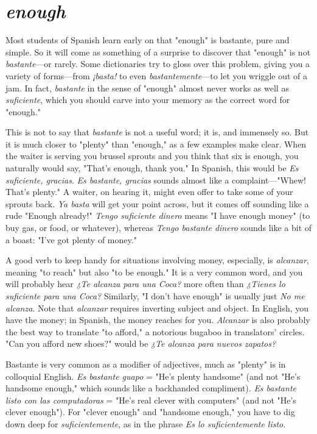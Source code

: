 \section{\emph{enough}}

Most students of Spanish learn early on that "enough" is bastante, pure and simple. So it will come as something of a surprise to
discover that "enough" is not \emph{bastante}---or rarely. Some dictionaries
try to gloss over this problem, giving you a variety of forms---from
\emph{¡basta!} to even \emph{bastantemente}---to let you wriggle out of a jam. In
fact, \emph{bastante} in the sense of "enough" almost never works as well as
\emph{suficiente}, which you should carve into your memory as the correct
word for "enough."

This is not to say that \emph{bastante} is not a useful word; it is,
and immensely so. But it is much closer to "plenty" than "enough,"
as a few examples make clear. When the waiter is serving you brussel sprouts and you think that six is enough, you naturally would say,
"That's enough, thank you." In Spanish, this would be \emph{Es suficiente,
gracias}. \emph{Es bastante, gracias} sounds almost like a complaint---"Whew!
That's plenty." A waiter, on hearing it, might even offer to take some
of your sprouts back. \emph{Ya basta} will get your point across, but it comes
off sounding like a rude "Enough already!" \emph{Tengo suficiente dinero}
means "I have enough money" (to buy gas, or food, or whatever),
whereas \emph{Tengo bastante dinero} sounds like a bit of a boast: "I've got
plenty of money."

A good verb to keep handy for situations involving money, especially, is \emph{alcanzar}, meaning "to reach" but also "to be enough." It is
a very common word, and you will probably hear \emph{¿Te alcanza para una
Coca?} more often than \emph{¿Tienes lo suficiente para una Coca?} Similarly,
"I don't have enough" is usually just \emph{No me alcanza}. Note that
\emph{alcanzar} requires inverting subject and object. In English, you have the
money; in Spanish, the money reaches for you. \emph{Alcanzar} is also probably the best way to translate "to afford," a notorious bugaboo in translators' circles. "Can you afford new shoes?" would be \emph{¿Te alcanza para
nuevos zapatos?}

Bastante is very common as a modifier of adjectives, much as
"plenty" is in colloquial English. \emph{Es bastante guapo} = "He's plenty
handsome" (and not "He's handsome enough," which sounds like a
backhanded compliment). \emph{Es bastante listo con las computadoras} =
"He's real clever with computers" (and not "He's clever enough"). For
"clever enough" and "handsome enough," you have to dig down deep
for \emph{suficientemente}, as in the phrase \emph{Es lo suficientemente listo}.


